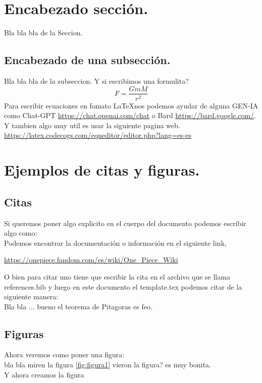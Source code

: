 \documentclass{article}
\begin{document}
\section{Encabezado sección.}
Bla bla bla de la Seccion.

\subsection{Encabezado de una subsección.}
Bla bla bla de la subseccion.
\newline
Y si escribimos una formulita?
\begin{equation}
F = \frac{G m M}{r^2}
\end{equation}
Para escribir ecuaciones en fomato \LaTeX  nos podemos ayudar de alguna GEN-IA como Chat-GPT \url{https://chat.openai.com/chat} o Bard \url{https://bard.google.com/}. Y tambien algo muy util es usar la siguiente pagina web. 
\url{https://latex.codecogs.com/eqneditor/editor.php?lang=es-es}


\section{Ejemplos de citas y figuras.}
\label{sec:others}

\subsection{Citas}
Si queremos poner algo explicito en el cuerpo del documento podemos escribir algo como:\\
Podemos encontrar la documentación o información en el siguiente link,
\begin{center}	\url{https://onepiece.fandom.com/es/wiki/One_Piece_Wiki}
\end{center}

O bien para citar uno tiene que escribir la cita en el archivo que se llama references.bib y luego en este documento el template.tex podemos citar de la siguiente manera:\\
\newline
Bla bla ... bueno el teorema de Pitagoras \cite{wikipedia-pitagoras} es feo.

\subsection{Figuras}
Ahora veremos como poner una figura: \\
bla bla miren la figura \ref{fig:figura1}
vieron la figura? es muy bonita.\\
Y ahora creamos la figura
\end{document}
